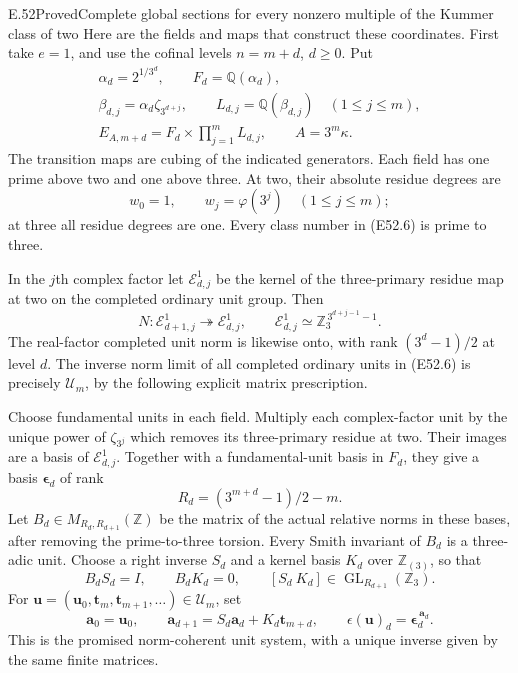 \begin{statement}{E.52}{Proved}{Complete global sections for every nonzero multiple of the Kummer class of two}
Here are the fields and maps that construct
these coordinates. First take $e=1$, and use the
cofinal levels $n=m+d$, $d\ge0$. Put
\[
 \begin{gathered}
 \alpha_d=2^{1/3^d},\qquad F_d=\mathbb Q(\alpha_d),\\
 \beta_{d,j}=\alpha_d\zeta_{3^{d+j}},\qquad
 L_{d,j}=\mathbb Q(\beta_{d,j})\quad(1\le j\le m),\\
 E_{A,m+d}=F_d\times\prod_{j=1}^m L_{d,j},
       \qquad A=3^m\kappa .
 \end{gathered}
 \tag{E52.6}
\]
The transition maps are cubing of the indicated
generators. Each field has one prime above two
and one above three. At two, their absolute
residue degrees are
\[
               w_0=1,\qquad w_j=\varphi(3^j)\quad(1\le j\le m);
 \tag{E52.7}
\]
at three all residue degrees are one.
Every class number in (E52.6) is prime to three.

In the $j$th complex factor let
$\mathcal E_{d,j}^1$ be the kernel of the
three-primary residue map at two on the
completed ordinary unit group. Then
\[
 N:\mathcal E_{d+1,j}^1\twoheadrightarrow\mathcal E_{d,j}^1,
 \qquad
 \mathcal E_{d,j}^1\simeq\mathbb Z_3^{\,3^{d+j-1}-1}.
 \tag{E52.8}
\]
The real-factor completed unit norm is likewise
onto, with rank $(3^d-1)/2$ at level $d$.
The inverse norm limit of all completed
ordinary units in (E52.6) is precisely
$\mathcal U_m$, by the following explicit
matrix prescription.

Choose fundamental units in each field.
Multiply each complex-factor unit by the
unique power of $\zeta_{3^j}$ which removes
its three-primary residue at two. Their
images are a basis of $\mathcal E_{d,j}^1$.
Together with a fundamental-unit basis in
$F_d$, they give a basis $\boldsymbol\epsilon_d$
of rank
\[
        R_d=(3^{m+d}-1)/2-m .
 \tag{E52.9}
\]
Let $B_d\in M_{R_d,R_{d+1}}(\mathbb Z)$ be
the matrix of the actual relative norms
in these bases, after removing the
prime-to-three torsion. Every Smith invariant
of $B_d$ is a three-adic unit. Choose a
right inverse $S_d$ and a kernel basis $K_d$
over $\mathbb Z_{(3)}$, so that
\[
 B_dS_d=I,\qquad B_dK_d=0,\qquad
 [S_d\ K_d]\in\operatorname{GL}_{R_{d+1}}(\mathbb Z_3).
 \tag{E52.10}
\]
For
$\boldsymbol u=(\boldsymbol u_0,
 \boldsymbol t_m,\boldsymbol t_{m+1},\ldots)\in\mathcal U_m$,
set
\[
 \boldsymbol a_0=\boldsymbol u_0,\qquad
 \boldsymbol a_{d+1}
       =S_d\boldsymbol a_d+K_d\boldsymbol t_{m+d},
 \qquad
 \epsilon(\boldsymbol u)_d
       =\boldsymbol\epsilon_d^{\,\boldsymbol a_d}.
 \tag{E52.11}
\]
This is the promised norm-coherent unit
system, with a unique inverse given by
the same finite matrices.


\end{statement}
